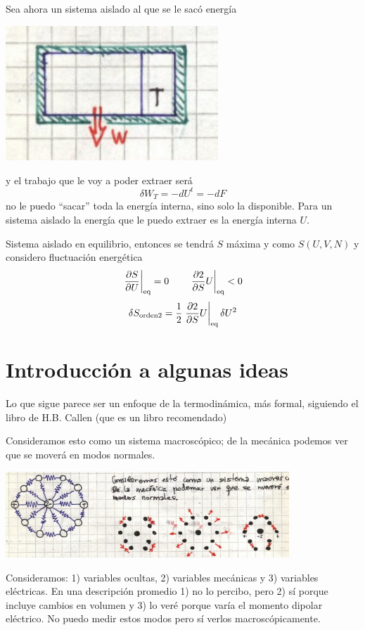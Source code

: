 \documentclass[10pt,oneside]{CBFT_book}
\begin{document}
Sea ahora un sistema aislado al que se le sacó energía

\includegraphics[width=0.60\textwidth]{images/1606329102.jpg}

y el trabajo que le voy a poder extraer será
\[
	\delta W_T = - dU^t = - dF
\]
no le puedo ``sacar'' toda la energía interna, sino solo la disponible.
Para un sistema aislado la energía que le puedo extraer es la energía interna $U$.


Sistema aislado en equilibrio, entonces se tendrá $S$ máxima y como $S(U,V,N)$ y considero fluctuación
energética
\[
	\left. \frac{\partial^{\hspace{-0.05em}} {S}}{\partial {U}^{\hspace{-0.05em}}} \right|_{\text{eq}} = 0 \qquad \left. \frac{\partial^{\hspace{-0.05em}} {2}}{\partial {S}^{\hspace{-0.05em}}}{U} \right|_{\text{eq}} < 0
\]
\[
	\delta S_{\mathrm{orden 2}} = \frac{1}{2} \left. \frac{\partial^{\hspace{-0.05em}} {2}}{\partial {S}^{\hspace{-0.05em}}}{U} \right|_{\text{eq}} \delta U^2
\]

\section{Introducción a algunas ideas}

Lo que sigue parece ser un enfoque de la termodinámica, más formal, siguiendo el libro de H.B. Callen (que
es un libro recomendado)

Consideramos esto como un sistema macroscópico; de la mecánica podemos ver que se moverá en modos
normales.

\includegraphics[width=0.80\textwidth]{images/1606329005.jpg}

Consideramos: 1) variables ocultas, 2) variables mecánicas y 3) variables eléctricas.
En una descripción promedio 1) no lo percibo, pero 2) sí porque incluye cambios en volumen y 3) lo veré
porque varía el momento dipolar eléctrico.
No puedo medir estos modos pero sí verlos macroscópicamente.
\end{document}

